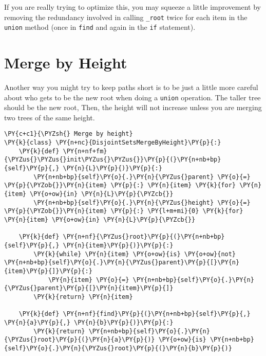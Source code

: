 If you are really trying to optimize this, you may squeeze a little improvement by removing the redundancy involved in calling \texttt{\_root} twice for each item in the \texttt{union} method (once in \texttt{find} and again in the \texttt{if} statement).

\section{Merge by Height}


Another way you might try to keep paths short is to be just a little more careful about who gets to be the new root when doing a \texttt{union} operation.  The taller tree should be the new root, Then, the height will not increase unless you are merging two trees of the same height.

\begin{Verbatim}[commandchars=\\\{\}]
\PY{c+c1}{\PYZsh{} Merge by height}
\PY{k}{class} \PY{n+nc}{DisjointSetsMergeByHeight}\PY{p}{:}
    \PY{k}{def} \PY{n+nf+fm}{\PYZus{}\PYZus{}init\PYZus{}\PYZus{}}\PY{p}{(}\PY{n+nb+bp}{self}\PY{p}{,} \PY{n}{L}\PY{p}{)}\PY{p}{:}
        \PY{n+nb+bp}{self}\PY{o}{.}\PY{n}{\PYZus{}parent} \PY{o}{=} \PY{p}{\PYZob{}}\PY{n}{item} \PY{p}{:} \PY{n}{item} \PY{k}{for} \PY{n}{item} \PY{o+ow}{in} \PY{n}{L}\PY{p}{\PYZcb{}}
        \PY{n+nb+bp}{self}\PY{o}{.}\PY{n}{\PYZus{}height} \PY{o}{=} \PY{p}{\PYZob{}}\PY{n}{item} \PY{p}{:} \PY{l+m+mi}{0} \PY{k}{for} \PY{n}{item} \PY{o+ow}{in} \PY{n}{L}\PY{p}{\PYZcb{}}

    \PY{k}{def} \PY{n+nf}{\PYZus{}root}\PY{p}{(}\PY{n+nb+bp}{self}\PY{p}{,} \PY{n}{item}\PY{p}{)}\PY{p}{:}
        \PY{k}{while} \PY{n}{item} \PY{o+ow}{is} \PY{o+ow}{not} \PY{n+nb+bp}{self}\PY{o}{.}\PY{n}{\PYZus{}parent}\PY{p}{[}\PY{n}{item}\PY{p}{]}\PY{p}{:}
            \PY{n}{item} \PY{o}{=} \PY{n+nb+bp}{self}\PY{o}{.}\PY{n}{\PYZus{}parent}\PY{p}{[}\PY{n}{item}\PY{p}{]}
        \PY{k}{return} \PY{n}{item}

    \PY{k}{def} \PY{n+nf}{find}\PY{p}{(}\PY{n+nb+bp}{self}\PY{p}{,} \PY{n}{a}\PY{p}{,} \PY{n}{b}\PY{p}{)}\PY{p}{:}
        \PY{k}{return} \PY{n+nb+bp}{self}\PY{o}{.}\PY{n}{\PYZus{}root}\PY{p}{(}\PY{n}{a}\PY{p}{)} \PY{o+ow}{is} \PY{n+nb+bp}{self}\PY{o}{.}\PY{n}{\PYZus{}root}\PY{p}{(}\PY{n}{b}\PY{p}{)}


\end{Verbatim}

